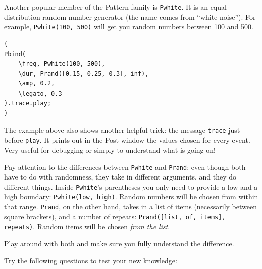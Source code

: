 Another popular member of the Pattern family is \texttt{Pwhite}. It is an equal distribution random number generator (the name comes from ``white noise''). For example, \texttt{Pwhite(100, 500)} will get you random numbers between 100 and 500.
 
\begin{lstlisting}[style=SuperCollider-IDE, basicstyle=\scttfamily\footnotesize]
(
Pbind(
	\freq, Pwhite(100, 500),
	\dur, Prand([0.15, 0.25, 0.3], inf),
	\amp, 0.2,
	\legato, 0.3
).trace.play;
)
\end{lstlisting}
 

The example above also shows another helpful trick: the message \texttt{trace} just before \texttt{play}. It prints out in the Post window the values chosen for every event. Very useful for debugging or simply to understand what is going on!

Pay attention to the differences between \texttt{Pwhite} and \texttt{Prand}: even though both have to do with randomness, they take in different arguments, and they do different things. Inside \texttt{Pwhite}'s parentheses you only need to provide a low and a high boundary: \texttt{Pwhite(low, high)}. Random numbers will be chosen from within that range. \texttt{Prand}, on the other hand, takes in a list of items (necessarily between square brackets), and a number of repeats: \texttt{Prand([list, of, items], repeats)}. Random items will be chosen \emph{from the list}.

Play around with both and make sure you fully understand the difference.


\bigskip
{}
\bigskip
 


Try the following questions to test your new knowledge:

